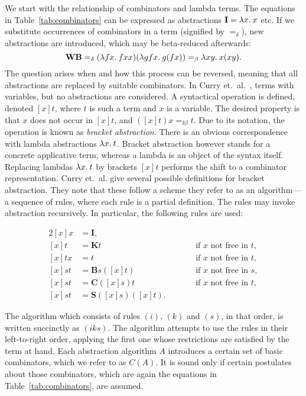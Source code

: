 We start with the relationship of combinators and lambda terms.
The equations in Table~\ref{tab:combinators} can be expressed as abstractions
$\mathbf{I} = \lambda x.\>x$ etc.
If we substitute occurrences of combinators in a term (signified by $=_\delta$),
new abstractions are introduced, which may be beta-reduced afterwards:
\[ \mathbf{WB} =_\delta (\lambda fx.\>fxx)(\lambda gfx.\>g(fx)) =_\beta \lambda xy.\>x(xy). \]
The question arises when and how this process can be reversed, meaning that
all abstractions are replaced by suitable combinators.
In Curry et.~al.~\cite[Section~6A]{curry68}, terms with variables, but no
abstractions are considered.
A syntactical operation is defined, denoted $[x]t$, where $t$ is such a term
and $x$ is a variable.
The desired property is that $x$ does not occur in $[x]t$, and
$([x]t)x =_{\delta\beta} t$.
Due to its notation, the operation is known as \emph{bracket abstraction}.
There is an obvious correspondence with lambda abstractions $\lambda x.\>t$.
Bracket abstraction however stands for a concrete applicative term, whereas
a lambda is an object of the syntax itself.
Replacing lambdas $\lambda x.\>t$ by brackets $[x]t$ performs the shift to a
combinator representation.
Curry et.\ al. give several possible definitions for bracket abstraction.
They note that these follow a scheme they refer to as an algorithm---a sequence
of rules, where each rule is a partial definition.
The rules may invoke abstraction recursively.
In particular, the following rules are used:

\begin{alignat}{2}
	\tag{$i$} [x]x &= \mathbf{I}, && \\
	\tag{$k$} [x]t &= \mathbf{K} t &&\qquad\text{if $x$ not free in $t$}, \\
	\tag{$\eta$} [x]tx &= t &&\qquad\text{if $x$ not free in $t$}, \\
	\tag{$b$} [x]st &= \mathbf{B}s([x]t) &&\qquad\text{if $x$ not free in $s$}, \\
	\tag{$c$} [x]st &= \mathbf{C}([x]s)t &&\qquad\text{if $x$ not free in $t$}, \\
	\tag{$s$} [x]st &= \mathbf{S}([x]s)([x]t). &&
\end{alignat}

The algorithm which consists of rules $(i)$, $(k)$ and $(s)$, in that order,
is written succinctly as $(iks)$.
The algorithm attempts to use the rules in their left-to-right order, applying
the first one whose restrictions are satisfied by the term at hand.
Each abstraction algorithm $A$ introduces a certain set of basic combinators,
which we refer to as $C(A)$.
It is sound only if certain postulates about those combinators, which are again
the equations in Table~\ref{tab:combinators}, are assumed.


